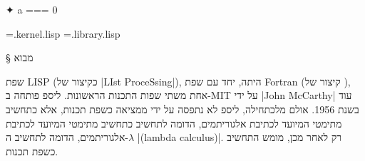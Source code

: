\def\CPL{\E|C|\xspace}

✦ a
===
\setcounter{library}0

\newread \tempFile %
\newwrite {} %
\newwrite \libraryFile %
\immediate \openout {}=\jobname.kernel.lisp
\immediate \openout \libraryFile=\jobname.library.lisp

\newenvironment{XLISP}{%
  \csname filecontents*\endcsname[overwrite]{\fileName}%
}{%
  \csname endfilecontents*\endcsname%
}

\newenvironment{KERNEL}{%
  \stepcounter{kernel}
  \def\fileName{\jobname.kernel.\arabic{kernel}.lisp}%
  \csname filecontents*\endcsname[overwrite]{\fileName}%
}{%
  \csname endfilecontents*\endcsname%
  \LTR
  \endLTR
  \openin \tempFile=\fileName
  \begingroup\endlinechar=-1
  \loop\unless\ifeof \tempFile
  \read\tempFile to\fileline %
  \immediate\write \kernelFile {\unexpanded\expandafter{\fileline}}
  \repeat
  \endgroup
  \closein \tempFile
}

\newenvironment{LIBRARY}{%
  \stepcounter{library}
  \def\fileName{\jobname.library.\arabic{library}.lisp}%
  \csname filecontents*\endcsname[overwrite]{\fileName}%
}{%
  \csname endfilecontents*\endcsname%
  \LTR
  \endLTR
  \newread \tempFile %
  \openin \tempFile=\fileName
  \begingroup\endlinechar=-1
  \loop\unless\ifeof \tempFile
  \read\tempFile to\fileline %
  \immediate\write \libraryFile
  {\unexpanded\expandafter{\fileline}} %
  \repeat
  \endgroup
  \closein \tempFile
}

§ מבוא

שפת LISP (כקיצור של \E|LIst ProceSsing|), היתה, יחד עם שפת Fortran (קיצור
של ), אחת משתי שפות התכנות הראשונות. ליספ פותחה
ב-MIT על ידי \E|John McCarthy| עוד בשנת 1956. אולם מלכתחילה, ליספ לא נתפסה על
ידי ממציאה כשפת תכנות, אלא כתחשיב מתימטי המיועד לכתיבת אלגוריתמים, הדומה לתחשיב
כתחשיב מתימטי המיועד לכתיבת אלגוריתמים, הדומה לתחשיב
ה-$λ$ \E|(lambda calculus)|. רק לאחר מכן, מומש התחשיב כשפת תכנות.

